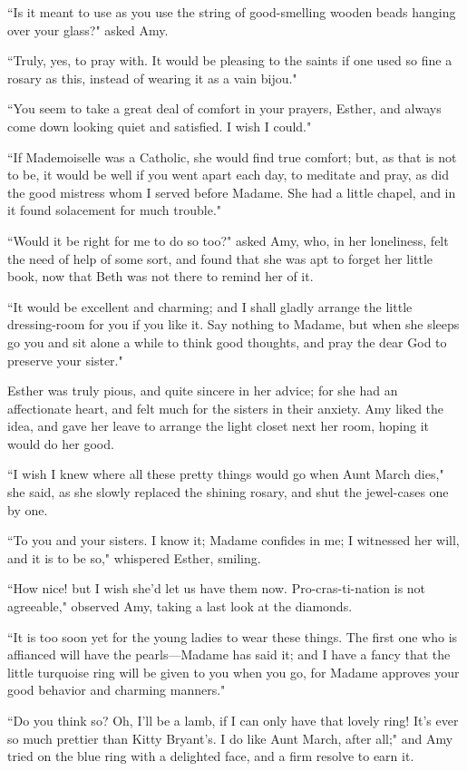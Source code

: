 ``Is it meant to use as you use the string of good-smelling wooden beads
hanging over your glass?" asked Amy.

``Truly, yes, to pray with. It would be pleasing to the saints if one
used so fine a rosary as this, instead of wearing it as a vain bijou."

``You seem to take a great deal of comfort in your prayers, Esther, and
always come down looking quiet and satisfied. I wish I could."

``If Mademoiselle was a Catholic, she would find true comfort; but, as
that is not to be, it would be well if you went apart each day, to
meditate and pray, as did the good mistress whom I served before Madame.
She had a little chapel, and in it found solacement for much trouble."

``Would it be right for me to do so too?" asked Amy, who, in her
loneliness, felt the need of help of some sort, and found that she was
apt to forget her little book, now that Beth was not there to remind her
of it.

``It would be excellent and charming; and I shall gladly arrange the
little dressing-room for you if you like it. Say nothing to Madame, but
when she sleeps go you and sit alone a while to think good thoughts, and
pray the dear God to preserve your sister."

Esther was truly pious, and quite sincere in her advice; for she had an
affectionate heart, and felt much for the sisters in their anxiety. Amy
liked the idea, and gave her leave to arrange the light closet next her
room, hoping it would do her good.

``I wish I knew where all these pretty things would go when Aunt March
dies," she said, as she slowly replaced the shining rosary, and shut the
jewel-cases one by one.

``To you and your sisters. I know it; Madame confides in me; I witnessed
her will, and it is to be so," whispered Esther, smiling.

``How nice! but I wish she'd let us have them now.
Pro-cras-ti-nation is not agreeable," observed Amy, taking a last look
at the diamonds.

``It is too soon yet for the young ladies to wear these things. The first
one who is affianced will have the pearls---Madame has said it; and I
have a fancy that the little turquoise ring will be given to you when
you go, for Madame approves your good behavior and charming manners."

``Do you think so? Oh, I'll be a lamb, if I can only have
that lovely ring! It's ever so much prettier than Kitty
Bryant's. I do like Aunt March, after all;" and Amy
tried on the blue ring with a delighted face, and a firm resolve to earn
it.

